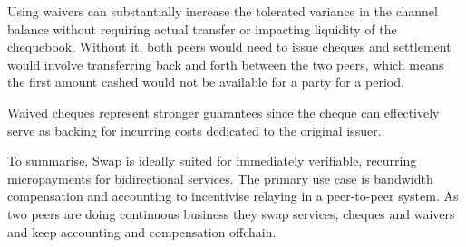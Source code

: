 Using waivers can substantially increase the tolerated variance in the channel balance
without requiring actual transfer or impacting liquidity of the chequebook.
Without it, both peers would need to issue cheques and settlement would involve
transferring back and forth between the two peers, which means the first amount cashed
would not be available for a party for a period.

Waived cheques represent stronger guarantees since the cheque can effectively serve
as backing for incurring costs dedicated to the original issuer.

To summarise, Swap is ideally suited for immediately verifiable, recurring micropayments for bidirectional
services. The primary use case is bandwidth compensation and accounting to incentivise
relaying in a peer-to-peer system. As two peers are doing continuous business
they swap services, cheques and waivers and keep accounting and compensation offchain.




